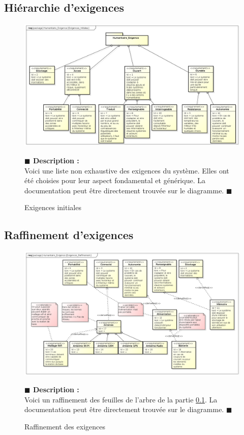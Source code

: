 \documentclass[11pt, titlepage]{report}
\newcommand{\debutDescription}{\noindent\textbf{\textcolor{DescriptionColor}{$\blacksquare$  Description : \\}}}
\newcommand{\finDescription}{\noindent\textcolor{DescriptionColor}{$\blacksquare$}}
\begin{document}
\subsection{Hiérarchie d'exigences}
\label{subsec:hierarchie_exigences}
\begin{figure}[h!]
\begin{center}
\includegraphics[scale=.4]{../images/diagrammes/sysml/exigence/exigences_initiales.png}
\caption{Exigences initiales}
\end{center}
\debutDescription
Voici une liste non exhaustive des exigences du système. Elles ont été choisies pour leur aspect fondamental et générique.
La documentation peut être directement trouvée sur le diagramme.
\finDescription
\end{figure}
\clearpage
\subsection{Raffinement d'exigences}
\begin{figure}[h!]
\begin{center}
\includegraphics[scale=.4]{../images/diagrammes/sysml/exigence/exigences_raffinement.png}
\caption{Raffinement des exigences}
\end{center}
\debutDescription
Voici un raffinement des feuilles de l'arbre de la partie \ref{subsec:hierarchie_exigences}. La documentation peut être directement trouvée sur le diagramme.
\finDescription
\end{figure}
\end{document}
